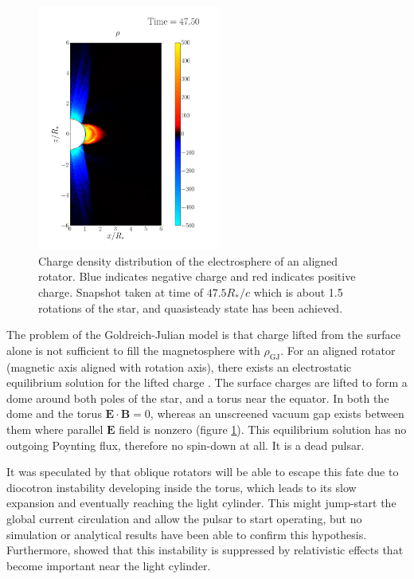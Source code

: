 \begin{figure}[h]
  \centering
  \includegraphics[width=0.54\textwidth]{pics/intro/electrosphere-new.png}
  \caption[Charge density distribution of the electrosphere of an aligned
  rotator.]{Charge density distribution of the electrosphere of an aligned
    rotator. Blue indicates negative charge and red indicates positive charge.
    Snapshot taken at time of $47.5R_{*}/c$ which is about 1.5 rotations of the
    star, and quasisteady state has been achieved.}
  \label{fig:electrosphere-intro}
\end{figure}

The problem of the Goldreich-Julian model is that charge lifted from the surface
alone is not sufficient to fill the magnetosphere with $\rho_\mathrm{GJ}$. For
an aligned rotator (magnetic axis aligned with rotation axis), there exists an
electrostatic equilibrium solution for the lifted charge
\citep{jackson_new_1976, krause-polstorff_pulsar_1985,
  krause-polstorff_electrosphere_1985}. The surface charges are lifted to form a
dome around both poles of the star, and a torus near the equator. In both the
dome and the torus $\mathbf{E}\cdot \mathbf{B} = 0$, whereas an unscreened
vacuum gap exists between them where parallel $\mathbf{E}$ field is nonzero
(figure \ref{fig:electrosphere-intro}). This equilibrium solution has no
outgoing Poynting flux, therefore no spin-down at all. It is a dead pulsar.

It was speculated by \citet{spitkovsky_electrodynamics_2004} that oblique
rotators will be able to escape this fate due to diocotron instability
developing inside the torus, which leads to its slow expansion and eventually
reaching the light cylinder. This might jump-start the global current
circulation and allow the pulsar to start operating, but no simulation or
analytical results have been able to confirm this hypothesis. Furthermore,
\citet{petri_relativistic_2007} showed that this instability is suppressed by
relativistic effects that become important near the light cylinder.

